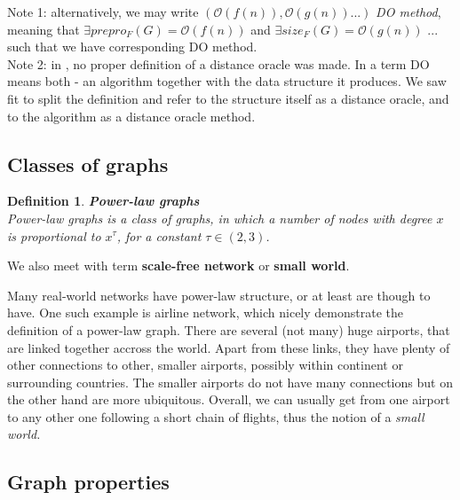 \documentclass[a4paper]{article}
\newtheorem{definition}{Definition}
\begin{document}
        \noindent Note 1: alternatively, we may write $(\mathcal{O}(f(n)), \mathcal{O}(g(n)) ...)$ \emph{DO method}, meaning that $\exists prepro_{F}(G) = \mathcal{O}(f(n))$ and $\exists size_{F}(G) = \mathcal{O}(g(n))$ ... such that we have corresponding DO method. \\

        \noindent Note 2: in \cite{apxdo05}, no proper definition of a distance oracle was made. %
        In \cite{sommerthesis10} a term DO means both - an algorithm together with the data structure it produces. We saw fit to split the definition and refer to the structure itself as a distance oracle, and to the algorithm as a distance oracle method.

        \subsection{Classes of graphs}
        \begin{definition}
            \textbf{Power-law graphs} \cite{powerlaw09} \\
            Power-law graphs is a class of graphs, in which a number of nodes with degree $x$ is proportional to $x^{\tau}$, for a constant $\tau \in (2, 3)$.
        \end{definition}

        \noindent We also meet with term \textbf{scale-free network} or \textbf{small world}.

        \noindent Many real-world networks have power-law structure, or at least are though to have. One such example is airline network, which nicely demonstrate the definition of a power-law graph. There are several (not many) huge airports, that are linked together accross the world. Apart from these links, they have plenty of other connections to other, smaller airports, possibly within continent or surrounding countries. The smaller airports do not have many connections but on the other hand are more ubiquitous. Overall, we can usually get from one airport to any other one following a short chain of flights, thus the notion of a \emph{small world.}

        \subsection{Graph properties}
\end{document}
